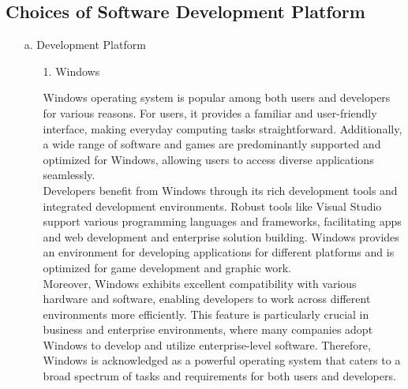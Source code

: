 \documentclass[conference]{IEEEtran}
\begin{document}
\subsection{Choices of Software Development Platform}
\begin{enumerate}
    \item[a.] Development Platform
    
    \begin{enumerate}
    \item[1.] Windows \cite{novac2017comparative} \cite{stallings2005windows}
    \item[] Windows operating system is popular among both users and developers for various reasons. For users, it provides a familiar and user-friendly interface, making everyday computing tasks straightforward. Additionally, a wide range of software and games are predominantly supported and optimized for Windows, allowing users to access diverse applications seamlessly.
    \\
    Developers benefit from Windows through its rich development tools and integrated development environments. Robust tools like Visual Studio support various programming languages and frameworks, facilitating apps and web development and enterprise solution building. Windows provides an environment for developing applications for different platforms and is optimized for game development and graphic work.
    \\
    Moreover, Windows exhibits excellent compatibility with various hardware and software, enabling developers to work across different environments more efficiently. This feature is particularly crucial in business and enterprise environments, where many companies adopt Windows to develop and utilize enterprise-level software. Therefore, Windows is acknowledged as a powerful operating system that caters to a broad spectrum of tasks and requirements for both users and developers. \\


\end{enumerate}
\end{enumerate}
\end{document}
